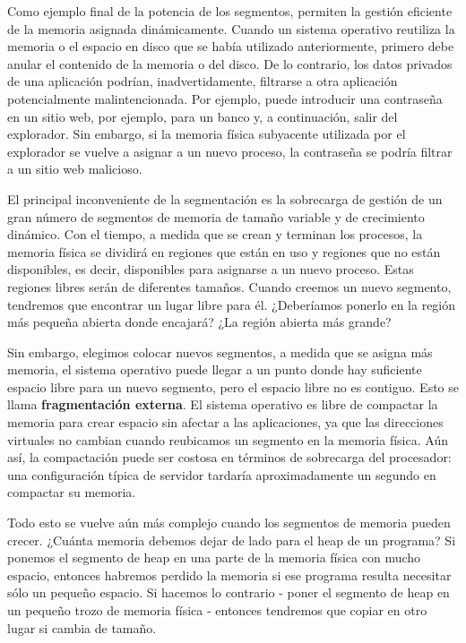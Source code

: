 \documentclass[10pt]{book}
\begin{document}
Como ejemplo final de la potencia de los segmentos, permiten la gestión eficiente de la memoria asignada dinámicamente. Cuando un sistema operativo reutiliza la memoria o el espacio en disco que se había utilizado anteriormente, primero debe anular el contenido de la memoria o del disco. De lo contrario, los datos privados de una aplicación podrían, inadvertidamente, filtrarse a otra aplicación potencialmente malintencionada. Por ejemplo, puede introducir una contraseña en un sitio web, por ejemplo, para un banco y, a continuación, salir del explorador. Sin embargo, si la memoria física subyacente utilizada por el explorador se vuelve a asignar a un nuevo proceso, la contraseña se podría filtrar a un sitio web malicioso.

El principal inconveniente de la segmentación es la sobrecarga de gestión de un gran número de segmentos de memoria de tamaño variable y de crecimiento dinámico. Con el tiempo, a medida que se crean y terminan los procesos, la memoria física se dividirá en regiones que están en uso y regiones que no están disponibles, es decir, disponibles para asignarse a un nuevo proceso. Estas regiones libres serán de diferentes tamaños. Cuando creemos un nuevo segmento, tendremos que encontrar un lugar libre para él. ¿Deberíamos ponerlo en la región más pequeña abierta donde encajará? ¿La región abierta más grande?

Sin embargo, elegimos colocar nuevos segmentos, a medida que se asigna más memoria, el sistema operativo puede llegar a un punto donde hay suficiente espacio libre para un nuevo segmento, pero el espacio libre no es contiguo. Esto se llama \textbf{fragmentación externa}. El sistema operativo es libre de compactar la memoria para crear espacio sin afectar a las aplicaciones, ya que las direcciones virtuales no cambian cuando reubicamos un segmento en la memoria física. Aún así, la compactación puede ser costosa en términos de sobrecarga del procesador: una configuración típica de servidor tardaría aproximadamente un segundo en compactar su memoria.

Todo esto se vuelve aún más complejo cuando los segmentos de memoria pueden crecer. ¿Cuánta memoria debemos dejar de lado para el heap de un programa? Si ponemos el segmento de heap en una parte de la memoria física con mucho espacio, entonces habremos perdido la memoria si ese programa resulta necesitar sólo un pequeño espacio. Si hacemos lo contrario - poner el segmento de heap en un pequeño trozo de memoria física - entonces tendremos que copiar en otro lugar si cambia de tamaño.
\end{document}

